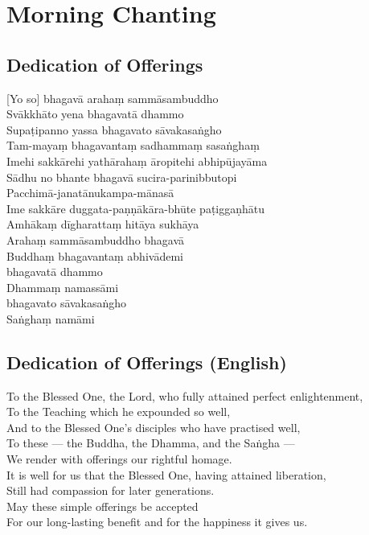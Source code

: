 \chapter{Morning Chanting}

\section*{Dedication of Offerings}

[Yo so] bhagavā arahaṃ sammāsambuddho\\
Svākkhāto yena bhagavatā dhammo\\
Supaṭipanno yassa bhagavato sāvakasaṅgho\\
Tam-mayaṃ bhagavantaṃ sadhammaṃ sasaṅghaṃ\\
Imehi sakkārehi yathārahaṃ āropitehi abhipūjayāma\\
Sādhu no bhante bhagavā sucira-parinibbutopi\\
Pacchimā-janatānukampa-mānasā\\
Ime sakkāre duggata-paṇṇākāra-bhūte paṭiggaṇhātu\\
Amhākaṃ dīgharattaṃ hitāya sukhāya\\
Arahaṃ sammāsambuddho bhagavā\\
Buddhaṃ bhagavantaṃ abhivādemi\\\relax
[Svākkhāto] bhagavatā dhammo\\
Dhammaṃ namassāmi\\\relax
[Supaṭipanno] bhagavato sāvakasaṅgho\\
Saṅghaṃ namāmi

\section*{Dedication of Offerings (English)}

To the Blessed One, the Lord, who fully attained perfect enlightenment,\\
To the Teaching which he expounded so well,\\
And to the Blessed One's disciples who have practised well,\\
To these --- the Buddha, the Dhamma, and the Saṅgha ---\\
We render with offerings our rightful homage.\\
It is well for us that the Blessed One, having attained liberation,\\
Still had compassion for later generations.\\
May these simple offerings be accepted\\
For our long-lasting benefit and for the happiness it gives us.


